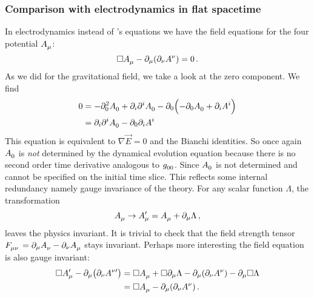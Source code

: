 \subsubsection{Comparison with electrodynamics in flat spacetime}
In electrodynamics instead of 's equations we have the field
equations for the four potential $\tensor{A}{_\mu}$:
\begin{equation}
\square\tensor{A}{_\mu}-\partial_\mu\left(\partial_\nu\tensor{A}{^\nu}
\right)=0\,.
\end{equation}
As we did for the gravitational field, we take a look
at the zero component. We find
\begin{equation}
\begin{split}
0&=-\partial_0^2\tensor{A}{_0}+\partial_i\partial^i\tensor{A}{_0}
-\partial_0\left(-\partial_0\tensor{A}{_0}+\partial_iA^i\right)\\
&= \partial_i\partial^i\tensor{A}{_0}-\partial_0\partial_iA^i
\end{split}
\end{equation}
This equation is equivalent to $\nabla\vec{E}=0$ and the Bianchi identities.
So once again $\tensor{A}{_0}$ is \emph{not} determined by the dynamical
evolution equation because there is no second order time derivative analogous to
$\tensor{g}{_0_0}$. Since $\tensor{A}{_0}$ is not determined and cannot be
specified on the initial time slice. This reflects some internal redundancy
namely gauge invariance of the theory. For any scalar function $\Lambda$, the
transformation
\begin{equation}
\tensor{A}{_\mu}\to\tensor*{A}{*_\mu^\prime}=
\tensor{A}{_\mu}+\partial_\mu\Lambda\,,
\end{equation}
leaves the physics invariant. It is trivial to check that
the field strength tensor \\
${\tensor{F}{_\mu_\nu}=\partial_\mu\tensor{A}{_\nu}-\partial_\nu\tensor{A}{_\mu}}$ stays invariant. Perhaps more
interesting the field equation is also gauge invariant:
\begin{equation}
\begin{split}
\square\tensor*{A}{*_\mu^\prime}-\partial_\mu\left(\partial_\nu\tensor*{A}{*^\nu^\prime}
\right)
&=
\square\tensor{A}{_\mu}+\square\partial_\mu\Lambda-\partial_\mu\left(\partial_\nu\tensor{A}{^\nu}
\right)-\partial_\mu\square\Lambda\\
&=
\square\tensor{A}{_\mu}-\partial_\mu\left(\partial_\nu\tensor{A}{^\nu}
\right)\,.
\end{split}
\end{equation}
